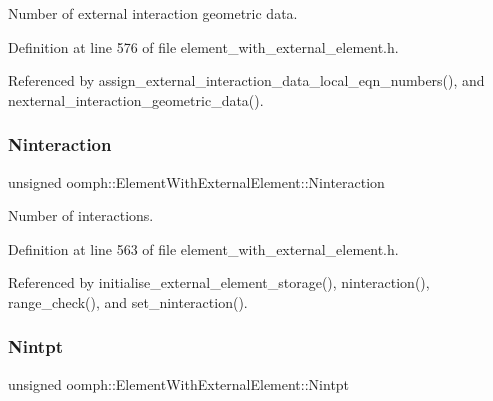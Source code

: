 Number of external interaction geometric data. 



Definition at line 576 of file element\+\_\+with\+\_\+external\+\_\+element.\+h.



Referenced by assign\+\_\+external\+\_\+interaction\+\_\+data\+\_\+local\+\_\+eqn\+\_\+numbers(), and nexternal\+\_\+interaction\+\_\+geometric\+\_\+data().

\mbox{\label{classoomph_1_1ElementWithExternalElement_ae0507a6c0f498237fa1e8fb75425374e}} 
\subsubsection{\texorpdfstring{Ninteraction}{Ninteraction}}
{\footnotesize\ttfamily unsigned oomph\+::\+Element\+With\+External\+Element\+::\+Ninteraction\hspace{0.3cm}{\ttfamily [private]}}



Number of interactions. 



Definition at line 563 of file element\+\_\+with\+\_\+external\+\_\+element.\+h.



Referenced by initialise\+\_\+external\+\_\+element\+\_\+storage(), ninteraction(), range\+\_\+check(), and set\+\_\+ninteraction().

\mbox{\label{classoomph_1_1ElementWithExternalElement_adf2db2b2968b867ff989b31eda9cc245}} 
\subsubsection{\texorpdfstring{Nintpt}{Nintpt}}
{\footnotesize\ttfamily unsigned oomph\+::\+Element\+With\+External\+Element\+::\+Nintpt\hspace{0.3cm}{\ttfamily [private]}}



